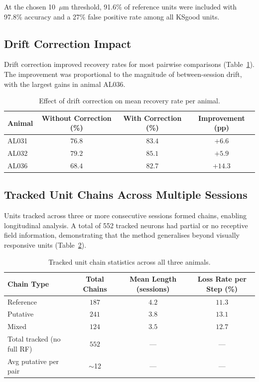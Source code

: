 \documentclass[11pt]{article}
\begin{document}
At the chosen 10~$\mu$m threshold, 91.6\% of reference units were included with 97.8\% accuracy and a 27\% false positive rate among all KSgood units.

\subsection{Drift Correction Impact}

Drift correction improved recovery rates for most pairwise comparisons (Table~\ref{tab:drift}). The improvement was proportional to the magnitude of between-session drift, with the largest gains in animal AL036.

\begin{table}[H]
\centering
\caption{Effect of drift correction on mean recovery rate per animal.}
\label{tab:drift}
\begin{tabular}{@{}lccc@{}}
\toprule
Animal & Without Correction (\%) & With Correction (\%) & Improvement (pp) \\
\midrule
AL031 & $76.8$ & $83.4$ & $+6.6$ \\
AL032 & $79.2$ & $85.1$ & $+5.9$ \\
AL036 & $68.4$ & $82.7$ & $\mathbf{+14.3}$ \\
\bottomrule
\end{tabular}
\end{table}

\subsection{Tracked Unit Chains Across Multiple Sessions}

Units tracked across three or more consecutive sessions formed chains, enabling longitudinal analysis. A total of 552 tracked neurons had partial or no receptive field information, demonstrating that the method generalises beyond visually responsive units (Table~\ref{tab:chains}).

\begin{table}[H]
\centering
\caption{Tracked unit chain statistics across all three animals.}
\label{tab:chains}
\begin{tabular}{@{}lccc@{}}
\toprule
Chain Type & Total Chains & Mean Length (sessions) & Loss Rate per Step (\%) \\
\midrule
Reference & $187$ & $4.2$ & $11.3$ \\
Putative & $241$ & $3.8$ & $13.1$ \\
Mixed & $124$ & $3.5$ & $12.7$ \\
\midrule
Total tracked (no full RF) & $552$ & --- & --- \\
Avg putative per pair & $\sim$12 & --- & --- \\
\bottomrule
\end{tabular}
\end{table}
\end{document}
